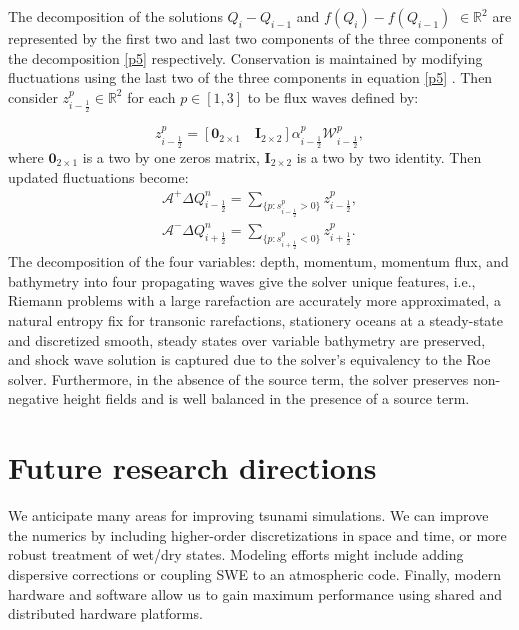 \documentclass[9pt,a4paper]{article}
\newcommand{\donna}[1]{{\color{red}{#1}}}
\begin{document}
	The decomposition of the solutions $Q_{i} - Q_{i-1} $  and  $f(Q_{i}) - f(Q_{i-1})$ $ \in  \mathbb{R}^{2}$ are represented by the first two and last two components of the three components of the decomposition \eqref{p5} respectively.  Conservation is maintained by modifying fluctuations using the last two of the three components  in equation \eqref{p5} . Then  consider $z_{i-\frac{1}{2}}^{p} \in \mathbb{R}^{2}$ for each $p \in [1,3]$ to be flux waves defined by:
	
	
	\begin{equation}
		z_{i-\frac{1}{2}}^{p} = [\mathbf{0}_{2\times1} \quad \mathbf{I}_{2\times2}] \alpha_{i-\frac{1}{2}}^{p} \mathcal{W}_{i-\frac{1}{2}}^{p},
	\end{equation}
	where $\mathbf{0}_{2\times1}$ is a two by one zeros matrix, $\mathbf{I}_{2\times2}$ is a two by two identity. Then updated fluctuations become:
	\begin{eqnarray}
		\mathcal{A^{+}}\Delta Q_{i-\frac{1}{2}}^{n} = \sum_{\{ p:s_{i-\frac{1}{2}}^{p}>0\}}  z_{i-\frac{1}{2}}^{p},
		\label{p7}\\
		\mathcal{A^{-}}\Delta Q_{i+\frac{1}{2}}^{n} = \sum_{\{ p:s_{i+\frac{1}{2}}^{p}<0\}} z_{i+\frac{1}{2}}^{p}.
		\label{p8}
	\end{eqnarray}
	The decomposition of the four variables: depth, momentum, momentum flux, and bathymetry into four propagating waves give the solver unique features, i.e.,  Riemann problems with a large rarefaction are accurately more approximated, a natural entropy fix for transonic rarefactions,  stationery oceans at a steady-state and discretized smooth, steady states over variable bathymetry are preserved, and shock wave solution is captured due to the solver's equivalency to the Roe solver.
	Furthermore, in the absence of the source term, the solver preserves non-negative height fields and is well balanced in the presence of a source term.  
	
	
	\section{ Future research directions}
	
	We anticipate many areas for improving tsunami simulations.  We can improve the numerics by including higher-order discretizations in space and time, or more robust treatment of  wet/dry states. Modeling efforts might include adding dispersive corrections or coupling  SWE to an atmospheric code.   Finally, modern hardware and software allow us to gain maximum performance using shared and distributed hardware  platforms. 
	
\end{document}
